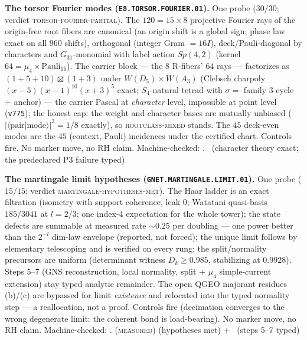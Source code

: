 \documentclass[11pt,a4paper]{article}
\theoremstyle{definition}
\begin{document}
\par\smallskip\noindent\textbf{The torsor Fourier modes
(\texttt{E8.TORSOR.FOURIER.01}).}
One probe ($30/30$; verdict \textsc{torsor-fourier-partial}).  The
$120=15\times8$ projective Fourier rays of the origin-free root
fibers are canonical (an origin shift is a global sign; phase law
exact on all $960$ shifts), orthogonal (integer Gram $=16I$),
deck/Pauli-diagonal by characters and $G_{31}$-monomial with label
action $Sp(4,2)$ (kernel $64=\mu_4\times\mathrm{Pauli}_{16}$).  The
carrier block --- the $8$ R-fibers' $64$ rays --- factorizes as
$(1{+}5{+}10)\boxtimes(1{+}3)$ under $W(D_5)\times W(A_3)$ (Clebsch
charpoly $(x{-}5)(x{-}1)^{10}(x{+}3)^5$ exact; $S_4$-natural tetrad
with $\sigma=$ family 3-cycle $+$ anchor) --- the carrier Pascal at
\emph{character} level, impossible at point level
(\texttt{v775}); the honest cap: the weight and character bases are
mutually unbiased ($|\langle\text{pair}|\text{mode}\rangle|^2=1/8$
exactly), so \textsc{rootclass-mixed} stands.  The $45$ deck-even
modes are the $45$ (context, Pauli) incidences under the certified
chart.  Controls fire.  No marker move, no RH claim.
Machine-checked: .
\mE\ (character theory exact; the predeclared P3 failure typed)
\par\smallskip

\par\smallskip\noindent\textbf{The martingale limit hypotheses
(\texttt{GNET.MARTINGALE.LIMIT.01}).}
One probe ($15/15$; verdict \textsc{martingale-hypotheses-met}).
The Haar ladder is an exact filtration (isometry with support
coherence, leak $0$; Watatani quasi-basis $185/3041$ at $l=2/3$;
one index-4 expectation for the whole tower); the state defects are
summable at measured rate ${\sim}0.25$ per doubling --- one power
better than the $2^{-l}$ dim-law envelope (reported, not forced);
the unique limit follows by elementary telescoping and is verified
on every rung; the split/normality precursors are uniform
(determinant witness $D_k\ge0.985$, stabilizing at $0.9928$).
Steps 5--7 (GNS reconstruction, local normality, split $+$ $\mu_4$
simple-current extension) stay typed analytic remainder.  The open
QGEO majorant residues (b)/(c) are bypassed for limit
\emph{existence} and relocated into the typed normality step --- a
reallocation, not a proof.  Controls fire (decimation converges to
the wrong degenerate limit: the coherent bond is load-bearing).  No
marker move, no RH claim.
Machine-checked: .
(\textsc{measured}) (hypotheses met) $+$ \mO\ (steps 5--7 typed)
\par\smallskip
\end{document}
